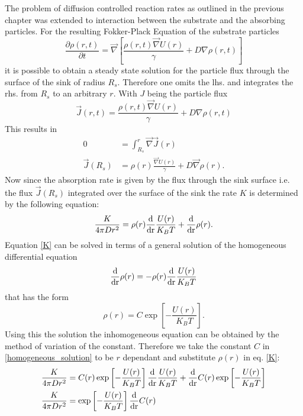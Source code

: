 The problem of diffusion controlled reaction rates as outlined in the previous chapter was extended to interaction between the substrate and the absorbing particles. For the resulting Fokker-Plack Equation of the substrate particles
\begin{equation}
    \frac{\partial \rho(r,t)}{\partial t} = \vec \nabla \left[ \frac{\rho(r,t)\vec \nabla U(r)}{\gamma} + D \nabla \rho(r,t) \right]
    \label{fpe_debye}
\end{equation}
it is possible to obtain a steady state solution for the particle flux through the surface of the sink of radius $R_s$. Therefore one omits the lhs. and integrates the rhs. from $R_s$ to an arbitrary $r$. With $J$ being the particle flux
\begin{equation}
    \vec J(r,t) =  \frac{\rho(r,t)\vec \nabla U(r)}{\gamma} + D \nabla \rho(r,t)
    \label{flux}
\end{equation}
This results in
\begin{align}
    0 &= \int_{R_s}^{r} \vec \nabla \vec J(r) \nonumber \\
    \vec J(R_s) &=  \rho(r)\frac{\vec \nabla U(r)}{\gamma} + D \vec \nabla \rho(r).
\end{align}
Now since the absorption rate is given by the flux through the sink surface i.e. the flux $\vec J (R_s)$ integrated over the surface of the sink the rate $K$ is determined by the following equation:
\begin{equation}
    \frac{K}{4\pi D r^{2}} = \rho(r)\frac{\rm d}{\rm d r} \frac{U(r)}{K_B T} + \frac{\rm d}{\rm d r} \rho(r).
    \label{K}
\end{equation}
Equation \eqref{K} can be solved in terms of a general solution of the homogeneous differential equation
\begin{equation}
    \frac{\rm d}{\rm d r} \rho(r) = -\rho(r) \frac{\rm d}{\rm d r} \frac{U(r)}{K_B T}
    \label{homogeneous_equation}
\end{equation}
that has the form
\begin{equation}
    \rho(r) = C \exp \left[ - \frac{U(r)}{K_B T} \right].
    \label{homogeneous_solution}
\end{equation}
Using this the solution the inhomogeneous equation can be obtained by the method of variation of the constant. Therefore we take the constant $C$ in \eqref{homogeneous_solution} to be $r$ dependant and substitute $\rho(r)$ in eq. \eqref{K}:
\begin{align}
    \frac{K}{4 \pi D r^2} &= C(r) \exp \left[ - \frac{U(r)}{K_B T} \right] \frac{\rm d}{\rm d r} \frac{U(r)}{K_B T} + \frac{\rm d}{\rm d r} C(r) \exp \left[ - \frac{U(r)}{K_B T} \right] \nonumber\\
    \frac{K}{ 4 \pi D r^2} &= \exp \left[ -\frac{U(r)}{K_B T} \right] \frac{\rm d }{\rm d r} C(r)
    \label{equation_C(r)}
\end{align}
